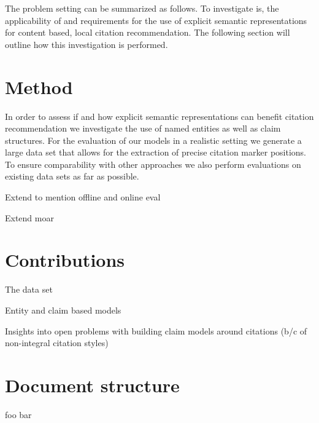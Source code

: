 The problem setting can be summarized as follows. To investigate is, the applicability of and requirements for the use of explicit semantic representations for content based, local citation recommendation. The following section will outline how this investigation is performed.

\section{Method}\label{sec:method}
In order to assess if and how explicit semantic representations can benefit citation recommendation we investigate the use of named entities as well as claim structures. For the evaluation of our models in a realistic setting we generate a large data set that allows for the extraction of precise citation marker positions. To ensure comparability with other approaches we also perform evaluations on existing data sets as far as possible.

Extend to mention offline and online eval

Extend moar

\section{Contributions}\label{sec:contributions}
The data set

Entity and claim based models

Insights into open problems with building claim models around citations (b/c of non-integral citation styles)

\section{Document structure}\label{sec:documentstructure}
foo bar


